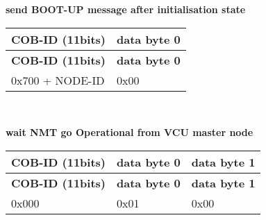 \begin{DoxyEnumerate}
\item {\bfseries send B\+O\+O\+T-\/\+UP message after initialisation state}~\newline
~\newline
 \tabulinesep=1mm
\begin{longtabu} spread 0pt [c]{*{2}{|X[-1]}|}
\hline
\rowcolor{\tableheadbgcolor}\textbf{ C\+O\+B-\/\+ID (11bits)  }&\textbf{ data byte 0   }\\
\endfirsthead
\hline
\endfoot
\hline
\rowcolor{\tableheadbgcolor}\textbf{ C\+O\+B-\/\+ID (11bits)  }&\textbf{ data byte 0   }\\
\endhead
0x700 + N\+O\+D\+E-\/\+ID  &0x00   \\
\end{longtabu}
~\newline
 


\item {\bfseries wait N\+MT \textquotesingle{}go Operational\textquotesingle{} from V\+CU master node}~\newline
~\newline
 \tabulinesep=1mm
\begin{longtabu} spread 0pt [c]{*{3}{|X[-1]}|}
\hline
\rowcolor{\tableheadbgcolor}\textbf{ C\+O\+B-\/\+ID (11bits)  }&\textbf{ data byte 0  }&\textbf{ data byte 1   }\\
\endfirsthead
\hline
\endfoot
\hline
\rowcolor{\tableheadbgcolor}\textbf{ C\+O\+B-\/\+ID (11bits)  }&\textbf{ data byte 0  }&\textbf{ data byte 1   }\\
\endhead
0x000  &0x01  &0x00   \\
\end{longtabu}
~\newline
 



\end{DoxyEnumerate}

